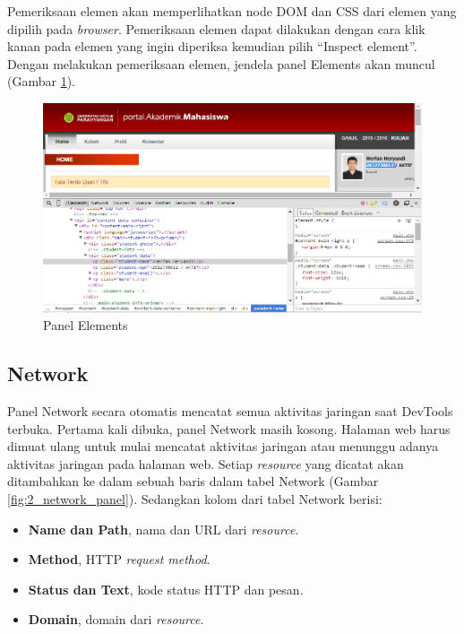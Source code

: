 Pemeriksaan elemen akan memperlihatkan node DOM dan CSS dari elemen yang dipilih pada \textit{browser}. Pemeriksaan elemen dapat dilakukan dengan cara klik kanan pada elemen yang ingin diperiksa kemudian pilih "`Inspect element"'. Dengan melakukan pemeriksaan elemen, jendela panel Elements akan muncul (Gambar \ref{fig:2_elements_panel}). 

\begin{figure}[H]
	\centering
	\includegraphics[scale=0.5]{Gambar/elements-panel}
	\caption{Panel Elements} 
	\label{fig:2_elements_panel}
\end{figure}

\subsection{Network}
Panel Network secara otomatis mencatat semua aktivitas jaringan saat DevTools terbuka. Pertama kali dibuka, panel Network masih kosong. Halaman web harus dimuat ulang untuk mulai mencatat aktivitas jaringan atau menunggu adanya aktivitas jaringan pada halaman web. Setiap \textit{resource} yang dicatat akan ditambahkan ke dalam sebuah baris dalam tabel Network (Gambar \ref{fig:2_network_panel}). Sedangkan kolom dari tabel Network berisi:
\begin{itemize}
	\item \textbf{Name dan Path}, nama dan URL dari \textit{resource}.
	\item \textbf{Method}, HTTP \textit{request method}.
	\item \textbf{Status dan Text}, kode status HTTP dan pesan.
	\item \textbf{Domain}, domain dari \textit{resource}.
\end{itemize}

